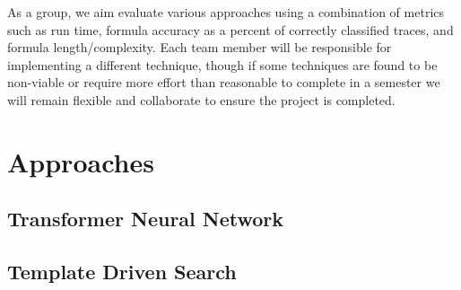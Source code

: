 \documentclass[12pt]{article}
\begin{document}
As a group, we aim evaluate various approaches using a combination of metrics such as run time, formula accuracy as a percent of correctly classified traces, and formula length/complexity.  
Each team member will be responsible for implementing a different technique, though if some techniques are found to be non-viable or require more effort than reasonable to complete in a semester we will remain flexible and collaborate to ensure the project is completed.

\section{Approaches}
  

\subsection{Transformer Neural Network}
	

\subsection{Template Driven Search}
	
\end{document}
